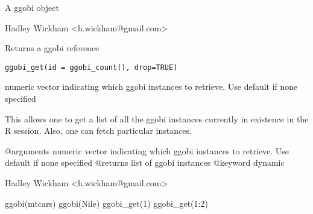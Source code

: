 \documentclass{article}
\begin{document}
\begin{Value}
A ggobi object
\end{Value}
\begin{Author}\relax
Hadley Wickham <h.wickham@gmail.com>
\end{Author}
\begin{Examples}
\end{Examples}

\begin{Description}\relax
Returns a ggobi reference
\end{Description}
\begin{Usage}
\begin{verbatim}ggobi_get(id = ggobi_count(), drop=TRUE)\end{verbatim}
\end{Usage}
\begin{Arguments}
\begin{ldescription}
\item[\code{id}] numeric vector indicating which ggobi instances to retrieve.  Use default if none specified
\item[\code{drop}] 
\end{ldescription}
\end{Arguments}
\begin{Details}\relax
This allows one to get a list of all the ggobi instances currently
in existence in the R session.  Also, one can fetch particular instances.

@arguments numeric vector indicating which ggobi instances to retrieve.  Use default if none specified
@returns list of ggobi instances
@keyword dynamic
\end{Details}
\begin{Author}\relax
Hadley Wickham <h.wickham@gmail.com>
\end{Author}
\begin{Examples}
\begin{ExampleCode}ggobi(mtcars)
ggobi(Nile)
ggobi_get(1)
ggobi_get(1:2)\end{ExampleCode}
\end{Examples}
\end{document}

